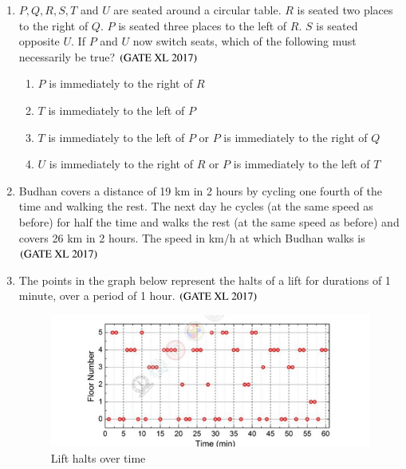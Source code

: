 \documentclass[journal]{IEEEtran}
\begin{document}
\begin{enumerate}
\item $P, Q, R, S, T$ and $U$ are seated around a circular table. $R$ is seated two places to the right of $Q$. $P$ is seated three places to the left of $R$. $S$ is seated opposite $U$. If $P$ and $U$ now switch seats, which of the following must necessarily be true? \hfill $\left(\text{GATE XL 2017}\right)$
\begin{enumerate}
    \item $P$ is immediately to the right of $R$
    \item $T$ is immediately to the left of $P$
    \item $T$ is immediately to the left of $P$ or $P$ is immediately to the right of $Q$
    \item $U$ is immediately to the right of $R$ or $P$ is immediately to the left of $T$
\end{enumerate}

\item Budhan covers a distance of 19 km in 2 hours by cycling one fourth of the time and walking the rest. The next day he cycles (at the same speed as before) for half the time and walks the rest (at the same speed as before) and covers 26 km in 2 hours. The speed in km/h at which Budhan walks is \hfill $\left(\text{GATE XL 2017}\right)$
\begin{enumerate}
\end{enumerate}

\item The points in the graph below represent the halts of a lift for durations of 1 minute, over a period of 1 hour. \hfill $\left(\text{GATE XL 2017}\right)$

\begin{figure}[H]
\centering
\includegraphics[width=0.75\columnwidth]{figs/fig_125.png}
\caption{\centering Lift halts over time}
\label{fig:placeholder_125}
\end{figure}


\end{enumerate}
\end{document}
